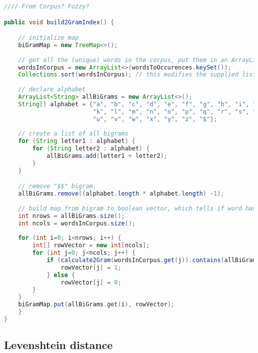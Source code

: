 \begin{lstlisting}[language=Java, caption=This is a code example., label=lst:2-gram]
//// From Corpus? Fuzzy?

public void build2GramIndex() {

	// initialize map
	biGramMap = new TreeMap<>();
	
	// get all the (unique) words in the corpus, put them in an ArrayList and sort them alphabetically.
	wordsInCorpus = new ArrayList<>(wordsToOccurences.keySet()); 
	Collections.sort(wordsInCorpus); // this modifies the supplied list
	
	// declare alphabet
	ArrayList<String> allBiGrams = new ArrayList<>();
	String[] alphabet = {"a", "b", "c", "d", "e", "f", "g", "h", "i", "j",
						 "k", "l", "m", "n", "o", "p", "q", "r", "s", "t",
						 "u", "v", "w", "x", "y", "z", "$"};
	
	// create a list of all bigrams
	for (String letter1 : alphabet) {
		for (String letter2 : alphabet) {
			allBiGrams.add(letter1 + letter2);
		}
	}

	// remove "$$" bigram.
	allBiGrams.remove((alphabet.length * alphabet.length) -1);
	
	// build map from bigram to boolean vector, which tells if word has bigram or not.
	int nrows = allBiGrams.size();
	int ncols = wordsInCorpus.size();
	
	for (int i=0; i<nrows; i++) {
		int[] rowVector = new int[ncols];
		for (int j=0; j<ncols; j++) {
			if (calculate2Gram(wordsInCorpus.get(j)).contains(allBiGrams.get(i))) { // inefficient calculates grams to many times. But luckily the map is build only once
				rowVector[j] = 1;
			} else {
				rowVector[j] = 0;
		}
	}
	biGramMap.put(allBiGrams.get(i), rowVector);
	}	
}
\end{lstlisting}


\subsection{Levenshtein distance}


